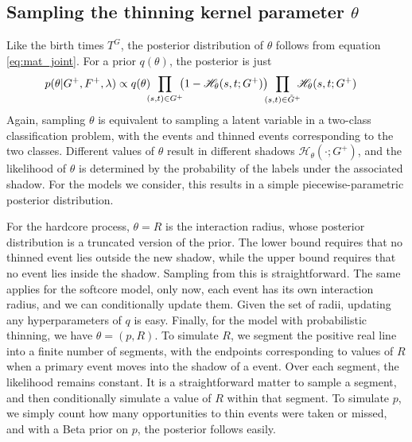 \documentclass{statsoc}
\begin{document}
\subsection{Sampling the thinning kernel parameter $\theta$}
Like the birth times $T^G$, the posterior distribution of $\theta$ follows from equation \eqref{eq:mat_joint}. For a prior $q(\theta)$, 
the posterior is just 
\begin{align}
 p(\theta | G^+, F^+, \lambda) &\propto  q(\theta) 
           \!\!\!   \prod_{({s}, {t}) \in G^+}\!\!\! \left( 1 - \mathscr{H}_{\theta}({s},{t};G^+)\right)  
           \!\!\!   \prod_{({s}, {t}) \in \tG^+}\!\!\! \mathscr{H}_{\theta}({s},{t};G^+)  
\end{align}
Again, sampling $\theta$ is equivalent to sampling a latent variable in a two-class classification problem,
with the \matern events and thinned events corresponding to the two classes. Different values of $\theta$ result in different shadows
$\mathscr{H}_{\theta}(\cdot; G^+)$, and the likelihood of $\theta$ is determined by the probability of the labels
under the associated shadow.
For the models we consider, this results in a simple piecewise-parametric posterior distribution.

For the \matern hardcore process, ${\theta = R}$ is the interaction radius, whose posterior distribution is a truncated version of the prior.
The lower bound requires that no thinned event lies outside the new shadow, while the upper bound
requires that no \matern event lies inside the shadow. %
Sampling from this is straightforward. %
The same applies for the softcore model, only now, each \matern event has
its own interaction radius, and we can conditionally update them. {Given the set of radii, updating any hyperparameters of $q$ is easy}.
Finally, for the model with probabilistic thinning, we have $\theta = (p,R)$. To simulate $R$, we segment the positive real line into a finite number of segments, with
the endpoints corresponding to values of $R$ when a primary event moves into the shadow of a \matern event. Over each segment, the likelihood remains constant.
It is a straightforward matter to sample a segment, and then conditionally simulate a value of $R$ within that segment.
To simulate $p$, we simply count how many opportunities to thin events were taken or missed, and with a Beta prior on $p$, the posterior follows easily.
\end{document}
